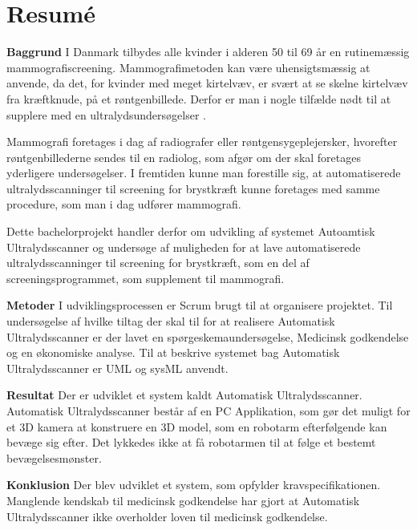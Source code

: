 \chapter{Resumé}
\textbf{Baggrund}
I Danmark tilbydes alle kvinder i alderen 50 til 69 år en rutinemæssig mammografiscreening. Mammografimetoden kan være uhensigtsmæssig at anvende, da det, for kvinder med meget kirtelvæv, er svært at se skelne kirtelvæv fra kræftknude, på et røntgenbillede. Derfor er man i nogle tilfælde nødt til at supplere med en ultralydsundersøgelser \cite{Ultralyd}.

Mammografi foretages i dag af radiografer eller røntgensygeplejersker, hvorefter røntgenbillederne sendes til en radiolog, som afgør om der skal foretages yderligere undersøgelser. I fremtiden kunne man forestille sig, at automatiserede ultralydsscanninger til screening for brystkræft kunne foretages med samme procedure, som man i dag udfører mammografi.

Dette bachelorprojekt handler derfor om udvikling af systemet Autoamtisk Ultralydsscanner og undersøge af muligheden for at lave automatiserede ultralydsscanninger til screening for brystkræft, som en del af screeningsprogrammet, som supplement til mammografi.

\textbf{Metoder}
I udviklingsprocessen er Scrum brugt til at organisere projektet. Til undersøgelse af hvilke tiltag der skal til for at realisere Automatisk Ultralydsscanner er der lavet en spørgeskemaundersøgelse, Medicinsk godkendelse og en økonomiske analyse. Til at beskrive systemet bag Automatisk Ultralydsscanner er UML og sysML anvendt. 

\textbf{Resultat}
Der er udviklet et system kaldt Automatisk Ultralydsscanner. Automatisk Ultralydsscanner består af en PC Applikation, som gør det muligt for et 3D kamera at konstruere en 3D model, som en robotarm efterfølgende kan bevæge sig efter. Det lykkedes ikke at få robotarmen til at følge et bestemt bevægelsesmønster. 

\textbf{Konklusion}
Der blev udviklet et system, som opfylder kravspecifikationen. Manglende kendskab til medicinsk godkendelse har gjort at Automatisk Ultralydsscanner ikke overholder loven til medicinsk godkendelse. 